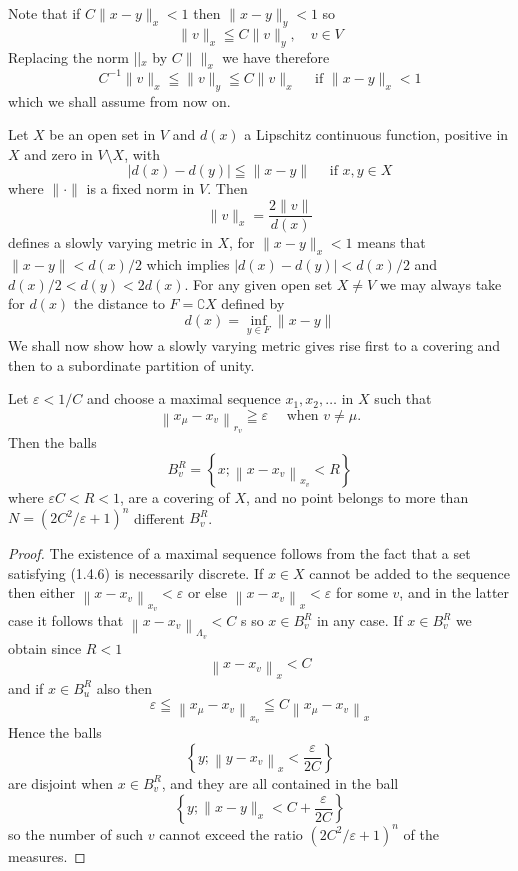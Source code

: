 Note that if $C\|x-y\|_{x}<1$ then $\|x-y\|_{y}<1$ so
\[
	\|v\|_{x} \leqq C\|v\|_{y}, \quad v \in V
\]
Replacing the norm ||$_{x}$ by $C\|\|_{x}$ we have therefore
\begin{equation}
    \label{(1.4.5)'}
    C^{-1}\|v\|_{x} \leqq\|v\|_{y} \leqq C\|v\|_{x} \quad \text { if }\|x-y\|_{x}<1
\end{equation}
which we shall assume from now on.

\begin{example}
    Let $X$ be an open set in $V$ and $d(x)$ a Lipschitz continuous function, positive in $X$ and zero in $V \setminus X$, with
\[
	|d(x)-d(y)| \leqq\|x-y\| \quad \text { if } x, y \in X
\]
where $\|\cdot \|$ is a fixed norm in $V$. Then
\[
	\|v\|_{x}= \frac{2\|v\|}{d(x)}
\]
defines a slowly varying metric in $X$, for $\|x-y\|_{x}<1$ means that $\|x-y\|<d(x) / 2$ which implies $|d(x)-d(y)|<d(x) / 2$ and $d(x) / 2<d(y)<2 d(x)$. For any given open set $X \neq V$ we may always take for $d(x)$ the distance to $F=\complement X$ defined by
\[
	d(x)=\inf _{y \in F}\|x-y\|
\]
We shall now show how a slowly varying metric gives rise first to a covering and then to a subordinate partition of unity.
\end{example}
\begin{lemma}
    Let $\varepsilon<1 / C$ and choose a maximal sequence $x_{1}, x_{2}, \ldots$ in $X$ such that
\begin{equation}
    \label{(1.4.6)}
	\left\|x_{\mu}-x_{v}\right\|_{r_{v}} \geqq \varepsilon \quad \text { when } v \neq \mu.
\end{equation}
Then the balls
\[
	B_{v}^{R}=\left\{x ;\left\|x-x_{v}\right\|_{x_{v}}<R\right\}
\]
where $\varepsilon C<R<1$, are a covering of $X$, and no point belongs to more than $N=\left(2 C^{2} / \varepsilon+1\right)^{n}$ different $B_{v}^{R}$.
\end{lemma}
\begin{proof}
    The existence of a maximal sequence follows from the fact that a set satisfying (1.4.6) is necessarily discrete. If $x \in X$ cannot be added to the sequence then either $\left\|x-x_{v}\right\|_{x_{v}}<\varepsilon$ or else $\left\|x-x_{v}\right\|_{x}<\varepsilon$ for some $v$, and in the latter case it follows that $\left\|x-x_{v}\right\|_{\Lambda_{v}}<C$ s so $x \in B_{v}^{R}$ in any case. If $x \in B_{v}^{R}$ we obtain since $R<1$
\[
	\left\|x-x_{v}\right\|_{x}<C
\]
and if $x \in B_{u}^{R}$ also then
\[
	\varepsilon \leqq\left\|x_{\mu}-x_{v}\right\|_{x_{v}} \leqq C\left\|x_{\mu}-x_{v}\right\|_{x}
\]
Hence the balls
\[
	\left\{y ;\left\|y-x_{v}\right\|_{x}< \frac{\varepsilon}{2C}\right\}
\]
are disjoint when $x \in B_{v}^{R}$, and they are all contained in the ball
\[
	\left\{y ;\|x-y\|_{x}<C+\frac{\varepsilon}{2C}\right\}
\]
so the number of such $v$ cannot exceed the ratio $\left(2 C^{2} / \varepsilon+1\right)^{n}$ of the measures.
\end{proof}

